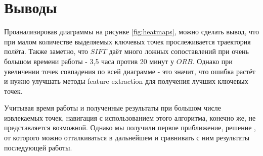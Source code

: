 \section{Выводы}

Проанализировав диаграммы на рисунке \ref{fig:heatmaps}, можно сделать вывод, что при малом количестве выделяемых ключевых точек прослеживается траектория полёта. Также заметно, что $SIFT$ даёт много ложных сопоставлений при очень большом времени работы - 3,5 часа против 20 минут у $ORB$. Однако при увеличении точек совпадения  по всей диаграмме - это значит, что ошибка растёт и нужно улучшать методы feature extraction для получения лучших ключевых точек.

Учитывая время работы и полученные результаты при большом числе извлекаемых точек, навигация с использованием этого алгоритма, конечно же, не представляется возможной. Однако мы получили первое приближение, решение , от которого можно отталкиваться в дальнейшем и сравнивать с ним результаты последующей работы.

\newpage
